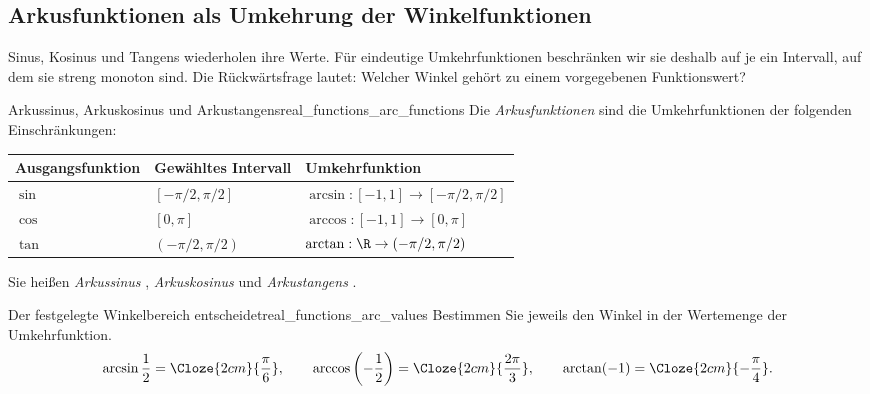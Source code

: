\clearpage
\subsection{Arkusfunktionen als Umkehrung der Winkelfunktionen}
\label{subsec:real_functions_arc_functions}
Sinus, Kosinus und Tangens wiederholen ihre Werte.
Für eindeutige Umkehrfunktionen beschränken wir sie deshalb auf je ein
Intervall, auf dem sie streng monoton sind. Die Rückwärtsfrage lautet:
Welcher Winkel gehört zu einem vorgegebenen Funktionswert?
\begin{center}
\end{center}
\par\noindent\begin{minipage}{\linewidth}
\begin{DefinitionBox}{Arkussinus, Arkuskosinus und Arkustangens}{real_functions_arc_functions}
  Die \emph{Arkusfunktionen} 
  sind die Umkehrfunktionen der folgenden Einschränkungen:
  \begin{center}
    \renewcommand{\arraystretch}{1.6}
    \begin{tabular}{@{}lll@{}}
      \toprule
      Ausgangsfunktion & Gewähltes Intervall & Umkehrfunktion\\ \midrule
      $\sin$ & $[-\pi/2,\pi/2]$ &
        $\arcsin:[-1,1]\to[-\pi/2,\pi/2]$\\
      $\cos$ & $[0,\pi]$ &
        $\arccos:[-1,1]\to[0,\pi]$\\
      $\tan$ & $(-\pi/2,\pi/2)$ &
        $\arctan:\R\to(-\pi/2,\pi/2)$\\
      \bottomrule
    \end{tabular}
  \end{center}
  Sie heißen \emph{Arkussinus} ,
  \emph{Arkuskosinus}  und
  \emph{Arkustangens} .
\end{DefinitionBox}
\begin{ExampleBox}[before skip=0.3\baselineskip]{Der festgelegte Winkelbereich entscheidet}{real_functions_arc_values}
  Bestimmen Sie jeweils den Winkel in der \textcolor{green!55!black}{Wertemenge} der Umkehrfunktion.
  \[
    \arcsin\frac12=\Cloze{2cm}{\frac\pi6},
    \qquad
    \arccos\left(-\frac12\right)=\Cloze{2cm}{\frac{2\pi}3},
    \qquad
    \arctan(-1)=\Cloze{2cm}{-\frac\pi4}.
  \]
\end{ExampleBox}
\end{minipage}

